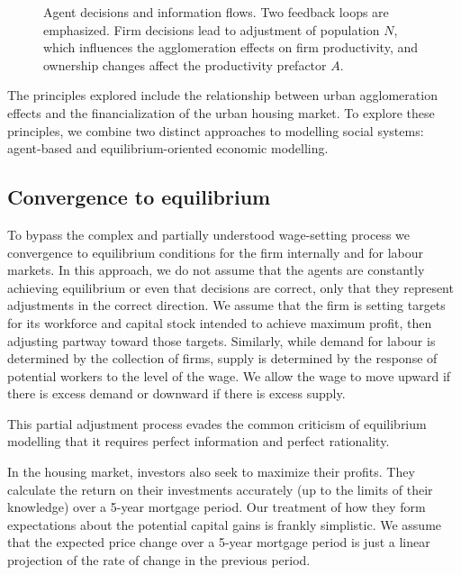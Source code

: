 \begin{figure}[h!tb]
\centering \vspace{2.5cm}
    
\caption[Main Agent decisions and information flows]{Agent decisions and information flows. Two feedback loops are emphasized. Firm decisions lead to adjustment of  population $N$,  which influences the agglomeration effects on firm productivity, and ownership changes affect the productivity prefactor $A$.}
\label{fig:information-flows}
\end{figure}


The principles explored include the relationship between urban agglomeration effects and the financialization of the urban housing market. To explore these principles, we combine two distinct approaches to modelling social systems: agent-based and equilibrium-oriented economic modelling. 


\subsection{Convergence to equilibrium}
To bypass the complex and partially understood wage-setting process we convergence to equilibrium conditions for the firm internally and for labour markets. In this approach, we do not assume that the agents are constantly achieving equilibrium or even that decisions are correct, only that they represent adjustments in the correct direction. We assume that the firm is setting targets for its workforce and capital stock intended to achieve maximum profit, then adjusting partway toward those targets. Similarly, while demand for labour is determined by the collection of firms, supply is determined by the response of potential workers to the level of the wage. We allow the wage to move upward if there is excess demand or downward if there is excess supply.

This partial adjustment process evades the common criticism of equilibrium modelling that it requires perfect information and perfect rationality.  

In the housing market, investors also seek to maximize their profits. They calculate the return on their investments accurately (up to the limits of their knowledge) over a 5-year mortgage period. Our treatment of how they form expectations about the potential capital gains is frankly simplistic. We assume that the expected price change over a 5-year mortgage period is just a linear projection of the rate of change in the previous period.  

